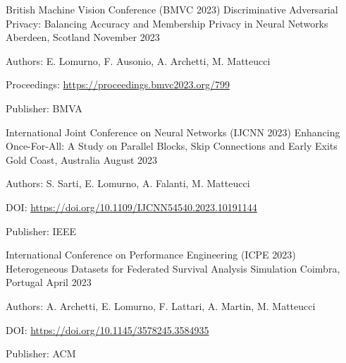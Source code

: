 \begin{cventries}
    \vspace{2mm}
    \cventry
        {British Machine Vision Conference (BMVC 2023)}
        {Discriminative Adversarial Privacy: Balancing Accuracy and Membership Privacy in Neural Networks}
        {Aberdeen, Scotland}
        {November 2023}
        {
        \begin{cvitems}
            \item {Authors: E. Lomurno, F. Ausonio, A. Archetti, M. Matteucci}
            \item {Proceedings: \url{https://proceedings.bmvc2023.org/799}}
            \item {Publisher: BMVA}
        \end{cvitems}
        }

    \vspace{2mm}
    \cventry
        {International Joint Conference on Neural Networks (IJCNN 2023)}
        {Enhancing Once-For-All: A Study on Parallel Blocks, Skip Connections and Early Exits}
        {Gold Coast, Australia}
        {August 2023}
        {
        \begin{cvitems}
            \item {Authors: S. Sarti, E. Lomurno, A. Falanti, M. Matteucci}
            \item {DOI: \url{https://doi.org/10.1109/IJCNN54540.2023.10191144}}
            \item {Publisher: IEEE}
        \end{cvitems}
        }

    \vspace{2mm}
    \cventry
        {International Conference on Performance Engineering (ICPE 2023)}
        {Heterogeneous Datasets for Federated Survival Analysis Simulation}
        {Coimbra, Portugal}
        {April 2023}
        {
        \begin{cvitems}
            \item {Authors: A. Archetti, E. Lomurno, F. Lattari, A. Martin, M. Matteucci}
            \item {DOI: \url{https://doi.org/10.1145/3578245.3584935}}
            \item {Publisher: ACM}
        \end{cvitems}
        }


\end{cventries}
